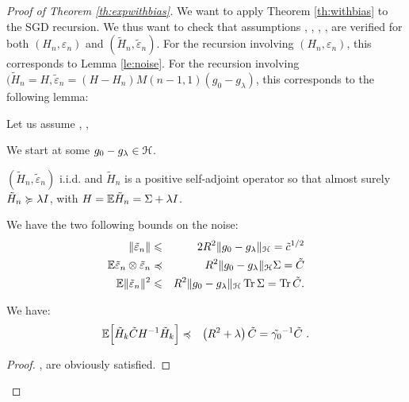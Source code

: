 \begin{proof}[Proof of Theorem \ref{th:expwithbias}]

We want to apply Theorem \ref{th:withbias} to the SGD recursion. We thus want to check that assumptions , , , ,  are verified for both $(H_n,\varepsilon_n)$ and $(\tilde{H}_n,\tilde{\varepsilon}_n)$. For the recursion involving $(H_n,\varepsilon_n)$, this corresponds to Lemma \ref{le:noise}. For the recursion involving $(\tilde{H}_n = H,\tilde{\varepsilon}_n = (H-H_n)M(n-1,1)(g_0-g_\lambda)$, this corresponds to the following lemma:

\begin{lemma}
\label{le:noiseauxiliary}
Let us assume , ,
\BIT
\item {}  We start at some $g_0 - g_\lambda \in {\mathcal H}$.
\item {}   $(\tilde{H}_n,\tilde{\varepsilon}_n)$ i.i.d. and $\tilde{H}_n$ is a positive self-adjoint operator so that almost surely $\tilde{H}_n \succcurlyeq \lambda I$, with $H  = {\mathbb E} \tilde{H}_n = \Sigma + \lambda I$.
\item {} We have the two following bounds on the noise:
\begin{eqnarray*}
 \| \tilde{\varepsilon}_n \| &\leqslant& 2 R^2 \|g_0-g_\lambda\|_{\mathcal H} = \tilde{c}^{1/2} \\
{\mathbb E} \tilde{\varepsilon}_n \otimes \tilde{\varepsilon}_n
& \preccurlyeq & R^2 \|g_0 - g_\lambda\|_{\mathcal H} \Sigma = \tilde{C}\\
{\mathbb E} \|\tilde{\varepsilon}_n\|^2 &\leqslant& R^2 \|g_0 - g_\lambda\|_{\mathcal H} \operatorname{Tr} \Sigma = \operatorname{Tr} \tilde{C}.
\end{eqnarray*} 
\item {} We have:
\begin{eqnarray*}
{\mathbb E} \Big[ \tilde{H}_k \tilde{C} H^{-1} \tilde{H}_k \Big] 
&  \preccurlyeq 
& \left(R^2 + \lambda\right) \tilde{C} = \tilde{\gamma_0}^{-1} \tilde{C}  \ .
\end{eqnarray*}
\EIT 
\end{lemma}

\begin{proof}

,  are obviously satisfied.


\end{proof}
\end{proof}

